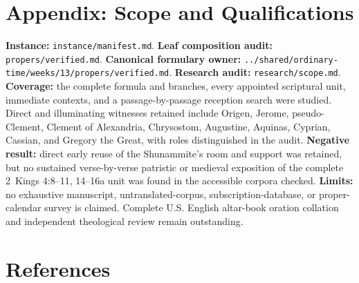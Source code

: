 \section*{Appendix: Scope and Qualifications}

\begin{studyframe}
\textbf{Instance:} \nolinkurl{instance/manifest.md}. \textbf{Leaf composition audit:} \nolinkurl{propers/verified.md}. \textbf{Canonical formulary owner:} \nolinkurl{../shared/ordinary-time/weeks/13/propers/verified.md}. \textbf{Research audit:} \nolinkurl{research/scope.md}. \textbf{Coverage:} the complete formula and branches, every appointed scriptural unit, immediate contexts, and a passage-by-passage reception search were studied. Direct and illuminating witnesses retained include Origen, Jerome, pseudo-Clement, Clement of Alexandria, Chrysostom, Augustine, Aquinas, Cyprian, Cassian, and Gregory the Great, with roles distinguished in the audit. \textbf{Negative result:} direct early reuse of the Shunammite's room and support was retained, but no sustained verse-by-verse patristic or medieval exposition of the complete 2~Kings 4:8--11, 14--16a unit was found in the accessible corpora checked. \textbf{Limits:} no exhaustive manuscript, untranslated-corpus, subscription-database, or proper-calendar survey is claimed. Complete U.S. English altar-book oration collation and independent theological review remain outstanding.
\end{studyframe}

\section*{References}

